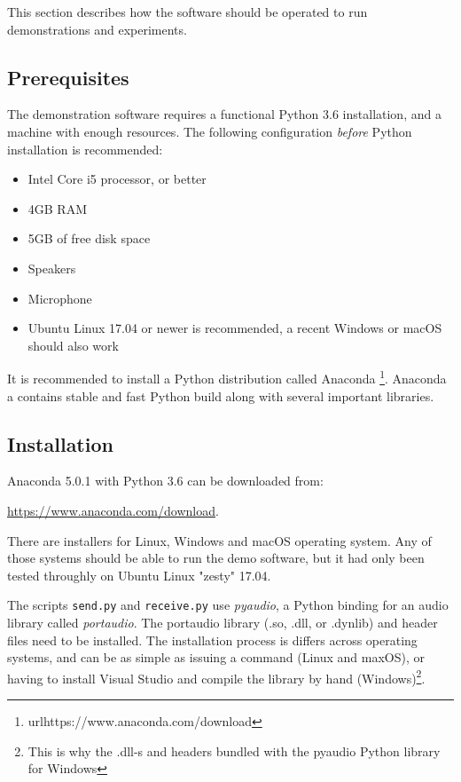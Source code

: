 \documentclass[a4paper]{article}
\begin{document}
This section describes how the software should be operated to run
demonstrations and experiments.

\subsection{Prerequisites}

The demonstration software requires a functional Python 3.6 
installation, and a machine with enough resources. The following 
configuration \textit{before} Python installation is recommended:

\begin{itemize}
\item Intel Core i5 processor, or better
\item 4GB RAM
\item 5GB of free disk space
\item Speakers
\item Microphone
\item Ubuntu Linux 17.04 or newer is recommended, a recent Windows or
macOS should also work
\end{itemize}

It is recommended to install a Python distribution called Anaconda 
\footnote{url{https://www.anaconda.com/download}}. Anaconda a contains 
stable and fast Python build along with several important libraries.

\subsection{Installation}

Anaconda 5.0.1 with Python 3.6 can be downloaded from:

\url{https://www.anaconda.com/download}.

There are installers for Linux, Windows and macOS operating system. Any 
of those systems should be able to run the demo software, but it had 
only been tested throughly on Ubuntu Linux "zesty" 17.04.

The scripts \texttt{send.py} and \texttt{receive.py} use 
\textit{pyaudio}, a Python binding for an audio library called 
\textit{portaudio}. The portaudio library (.so, .dll, or .dynlib) and 
header files need to be installed. The installation process is differs 
across operating systems, and can be as simple as issuing a command 
(Linux and maxOS), or having to install Visual Studio and compile the 
library by hand (Windows)\footnote{This is why the .dll-s and headers 
bundled with the pyaudio Python library for Windows}.
\end{document}
